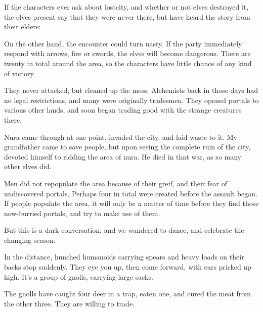 \begin{multicols}{2}
If the characters ever ask about \gls{lostcity}, and whether or not elves destroyed it, the elves present say that they were never there, but have heard the story from their elders:

On the other hand, the encounter could turn nasty.
If the party immediately respond with arrows, fire or swords, the elves will become dangerous.
There are twenty in total around the area, so the characters have little chance of any kind of victory.

\begin{speechtext}

	They never attacked, but cleaned up the mess.  Alchemists back in those days had no legal restrictions, and many were originally tradesmen.  They opened portals to various other lands, and soon began trading good with the strange creatures there.

	Nura came through at one point, invaded the city, and laid waste to it.  My grandfather came to save people, but upon seeing the complete ruin of the city, devoted himself to ridding the area of nura.  He died in that war, as so many other elves did.

	Men did not repopulate the area because of their greif, and their fear of undiscovered portals.  Perhaps four in total were created before the assault began.  If people populate the area, it will only be a matter of time before they find those now-burried portals, and try to make use of them.

	But this is a dark conversation, and we wandered to dance, and celebrate the changing season.

\end{speechtext}


\begin{boxtext}

	In the distance, hunched humanoids carrying spears and heavy loads on their backs stop suddenly.
	They eye you up, then come forward, with ears pricked up high.
	It's a group of gnolls, carrying large sacks.

\end{boxtext}

The gnolls have caught four deer in a trap, eaten one, and cured the meat from the other three.  They are willing to trade.


\gnollhunter



\end{multicols}
